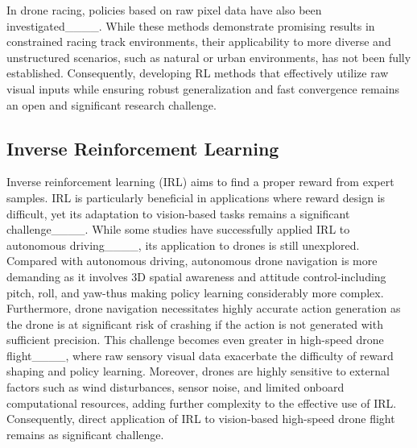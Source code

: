 In drone racing, policies based on raw pixel data have also been investigated____. While these methods demonstrate promising results in constrained racing track environments, their applicability to more diverse and unstructured scenarios, such as natural or urban environments, has not been fully established. Consequently, developing RL methods that effectively utilize raw visual inputs while ensuring robust generalization and fast convergence remains an open and significant research challenge.

\subsection{Inverse Reinforcement Learning}
Inverse reinforcement learning (IRL) aims to find a proper reward from expert samples. IRL is particularly beneficial in applications where reward design is difficult, yet its adaptation to vision-based tasks remains a significant challenge____. While some studies have successfully applied IRL to autonomous driving____, its application to drones is still unexplored. Compared with autonomous driving, autonomous drone navigation is more demanding as it involves 3D spatial awareness and attitude control-including pitch, roll, and yaw-thus making policy learning considerably more complex. Furthermore, drone navigation necessitates highly accurate action generation as the drone is at significant risk of crashing if the action is not generated with sufficient precision. This challenge becomes even greater in high-speed drone flight____, where raw sensory visual data exacerbate the difficulty of reward shaping and policy learning. Moreover, drones are highly sensitive to external factors such as wind disturbances, sensor noise, and limited onboard computational resources, adding further complexity to the effective use of IRL. Consequently, direct application of IRL to vision-based high-speed drone flight remains as significant challenge.